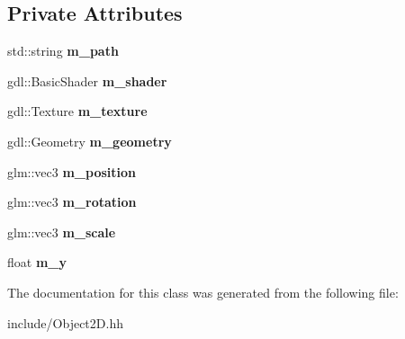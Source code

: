 \subsection*{Private Attributes}
\begin{DoxyCompactItemize}
\item 
\hypertarget{class_object2_d_a3540dd44f006f79fb645bf49e7cdecc2}{}std\+::string {\bfseries m\+\_\+path}\label{class_object2_d_a3540dd44f006f79fb645bf49e7cdecc2}

\item 
\hypertarget{class_object2_d_ad2279c44640235099fc4b4847115a977}{}gdl\+::\+Basic\+Shader {\bfseries m\+\_\+shader}\label{class_object2_d_ad2279c44640235099fc4b4847115a977}

\item 
\hypertarget{class_object2_d_a387b4b2df7c3e6474750e45a15658a23}{}gdl\+::\+Texture {\bfseries m\+\_\+texture}\label{class_object2_d_a387b4b2df7c3e6474750e45a15658a23}

\item 
\hypertarget{class_object2_d_a9552d9db039d73bf37044bb46532ab72}{}gdl\+::\+Geometry {\bfseries m\+\_\+geometry}\label{class_object2_d_a9552d9db039d73bf37044bb46532ab72}

\item 
\hypertarget{class_object2_d_ab75556748a6a944c5a2c8ded7b0c2b9f}{}glm\+::vec3 {\bfseries m\+\_\+position}\label{class_object2_d_ab75556748a6a944c5a2c8ded7b0c2b9f}

\item 
\hypertarget{class_object2_d_af8603188fe6daaebaf021451e9336afe}{}glm\+::vec3 {\bfseries m\+\_\+rotation}\label{class_object2_d_af8603188fe6daaebaf021451e9336afe}

\item 
\hypertarget{class_object2_d_ae2f093b66221482c0468ed1264f9cbe0}{}glm\+::vec3 {\bfseries m\+\_\+scale}\label{class_object2_d_ae2f093b66221482c0468ed1264f9cbe0}

\item 
\hypertarget{class_object2_d_a27464bb1812199ef90e5a167f254c14f}{}float {\bfseries m\+\_\+y}\label{class_object2_d_a27464bb1812199ef90e5a167f254c14f}

\end{DoxyCompactItemize}


The documentation for this class was generated from the following file\+:\begin{DoxyCompactItemize}
\item 
include/Object2\+D.\+hh\end{DoxyCompactItemize}
